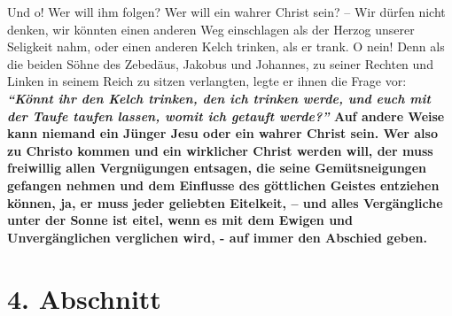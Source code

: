 Und o! Wer will ihm folgen? Wer will ein wahrer Christ sein? -- Wir dürfen nicht
denken, wir könnten einen anderen Weg einschlagen als der Herzog unserer
Seligkeit nahm,
oder einen anderen Kelch trinken, als er
trank. O nein! Denn als die beiden Söhne des Zebedäus,
Jakobus und Johannes, zu
seiner Rechten und Linken in seinem Reich zu sitzen verlangten, legte er ihnen
die Frage vor:
\label{ref:16_03_kelch_tringen}
\textbf{\textit{"`Könnt ihr den Kelch trinken, den ich trinken werde, und euch
mit der Taufe taufen lassen, womit ich getauft werde?"'}
Auf andere Weise kann niemand ein Jünger Jesu oder ein wahrer Christ sein. Wer
also zu Christo kommen und ein wirklicher Christ werden will, der muss
freiwillig
allen Vergnügungen entsagen, die seine Gemütsneigungen gefangen nehmen und dem
Einflusse des göttlichen Geistes entziehen können, ja, er muss jeder geliebten
Eitelkeit, -- und alles Vergängliche unter der Sonne ist eitel, wenn es mit dem
Ewigen und Unvergänglichen verglichen wird, - auf immer den Abschied geben.}

\section{4. Abschnitt} \label{kap16_ab4}

